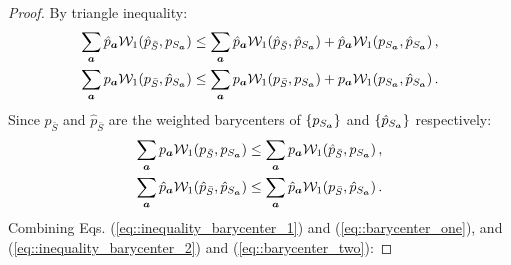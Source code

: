\documentclass[letterpaper]{article}
\theoremstyle{definition}
\newcommand{\W}{\mathcal{W}}
\newcommand{\bS}{\bar{S}}
\begin{document}
\begin{proof}
By triangle inequality:
\begin{align}
\sum_{\va} \hat{p}_{\va} \W_1(\hat{p}_{\bS}, p_{S_\va}) &\leq \sum_{\va} \hat{p}_{\va}\W_1(\hat{p}_{\bS}, \hat{p}_{S_\va}) +  \hat{p}_{\va}\W_1(p_{S_\va}, \hat{p}_{S_\va})\,, \label{eq::inequality_barycenter_1}\\
\sum_{\va} p_{\va}\W_1(p_{\bS}, \hat{p}_{S_\va}) &\leq \sum_{\va}p_{\va} \W_1(p_{\bS}, p_{S_\va}) +  p_{\va}\W_1(p_{S_\va}, \hat{p}_{S_\va})\,. \label{eq::inequality_barycenter_2}
\end{align}
Since $p_{\bar{S}}$ and $\hat{p}_{\bar{S}}$ are the weighted barycenters of $\{p_{S_{{\bm{a}}}}\}$ and $\{ \hat{p}_{S_{{\bm{a}}}}\}$ respectively:
\begin{align}
\sum_{\va} p_{\va}\W_1(p_{\bS}, p_{S_\va}) &\leq \sum_{\va}p_{\va} \W_1(\hat{p}_{\bS} , p_{S_\va}) \label{eq::barycenter_one} \,,\\
\sum_{\va}\hat{p}_{\va} \W_1(\hat{p}_{\bS}, \hat{p}_{S_\va} ) &\leq \sum_{\va} \hat{p}_{\va} \W_1(p_{\bS}, \hat{p}_{S_\va})\,. \label{eq::barycenter_two}
\end{align}
Combining Eqs. (\ref{eq::inequality_barycenter_1}) and (\ref{eq::barycenter_one}), and (\ref{eq::inequality_barycenter_2}) and (\ref{eq::barycenter_two}):


\end{proof}
\end{document}
